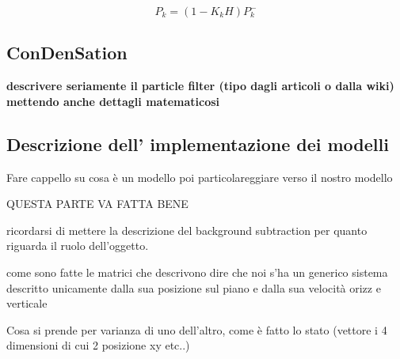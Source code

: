 \begin{equation}\label{eq:P}
P_k=(1-K_kH)P_k^-
\end{equation} 

\subsection{ConDenSation}\label{condensation}
\textbf{descrivere seriamente il particle filter (tipo dagli articoli o dalla wiki) mettendo anche dettagli matematicosi}

\subsection{Descrizione dell' implementazione dei modelli}
Fare cappello su cosa è un modello poi particolareggiare verso il nostro modello

QUESTA PARTE VA FATTA BENE

ricordarsi di mettere la descrizione del background subtraction per quanto riguarda il ruolo dell'oggetto.

come sono fatte le matrici che descrivono 
dire che noi s'ha un generico sistema descritto unicamente dalla sua posizione sul piano e dalla sua velocità orizz e verticale

Cosa si prende per varianza di uno dell'altro, come è fatto lo stato (vettore i 4 dimensioni di cui 2 posizione xy etc..)
